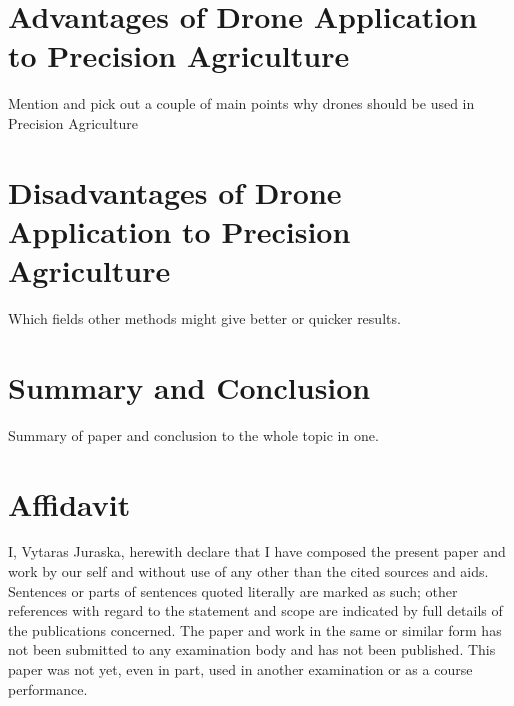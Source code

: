 \documentclass[conference]{IEEEtran}
\begin{document}
\section{Advantages of Drone Application to Precision Agriculture}

    Mention and pick out a couple of main points why drones should be used in Precision Agriculture

\section{Disadvantages of Drone Application to Precision Agriculture}

    Which fields other methods might give better or quicker results.

\section{Summary and Conclusion}

    Summary of paper and conclusion to the whole topic in one.

\section{Affidavit}
I, Vytaras Juraska, herewith declare that I have composed the present paper and work by our self and without use of any other than the cited sources and aids. Sentences or parts of sentences quoted literally are marked as such; other references with regard to the statement and scope are indicated by full details of the publications concerned. The paper and work in the same or similar form has not been submitted to any examination body and has not been published. This paper was not yet, even in part, used in another examination or as a course performance.
\end{document}
